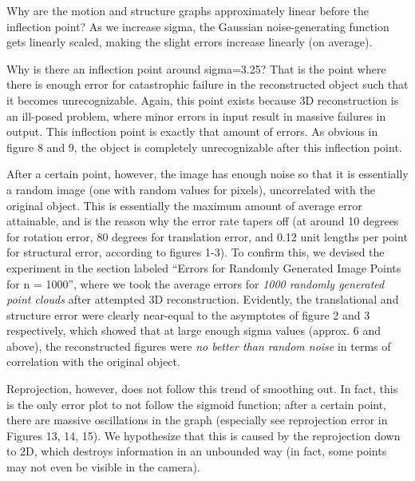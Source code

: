 \documentclass{article}
\begin{document}
Why are the motion and structure graphs approximately linear before the inflection point? As we increase sigma, the Gaussian noise-generating function gets linearly scaled, making the slight errors increase linearly (on average).

Why is there an inflection point around sigma=3.25? That is the point where there is enough error for catastrophic failure in the reconstructed object such that it becomes unrecognizable. Again, this point exists because 3D reconstruction is an ill-posed problem, where minor errors in input result in massive failures in output. This inflection point is exactly that amount of errors. As obvious in figure 8 and 9, the object is completely unrecognizable after this inflection point.


After a certain point, however, the image has enough noise so that it is essentially a random image (one with random values for pixels), uncorrelated with the original object. This is essentially the maximum amount of average error attainable, and is the reason why the error rate tapers off (at around 10 degrees for rotation error, 80 degrees for translation error, and 0.12 unit lengths per point for structural error, according to figures 1-3). To confirm this, we devised the experiment in the section labeled ``Errors for Randomly Generated Image Points for n = 1000'', where we took the average errors for \textit{1000 randomly generated point clouds} after attempted 3D reconstruction. Evidently, the translational and structure error were clearly near-equal to the asymptotes of figure 2 and 3 respectively, which showed that at large enough sigma values (approx. 6 and above), the reconstructed figures were \textit{no better than random noise} in terms of correlation with the original object.




Reprojection, however, does not follow this trend of smoothing out. In fact, this is the only error plot to not follow the sigmoid function; after a certain point, there are massive oscillations in the graph (especially see reprojection error in Figures 13, 14, 15). We hypothesize that this is caused by the reprojection down to 2D, which destroys information in an unbounded way (in fact, some points may not even be visible in the camera).
\end{document}
